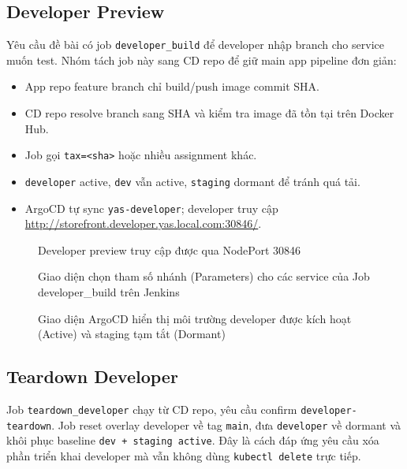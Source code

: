 \subsection{Developer Preview}

Yêu cầu đề bài có job \texttt{developer\_build} để developer nhập branch cho service
muốn test. Nhóm tách job này sang CD repo để giữ main app pipeline đơn giản:

\begin{itemize}
    \item App repo feature branch chỉ build/push image commit SHA.
    \item CD repo  resolve branch sang SHA và kiểm tra image đã tồn tại trên Docker Hub.
    \item Job gọi  \texttt{tax=<sha>} hoặc nhiều assignment khác.
    \item \texttt{developer} active, \texttt{dev} vẫn active, \texttt{staging} dormant để tránh quá tải.
    \item ArgoCD tự sync \texttt{yas-developer}; developer truy cập \url{http://storefront.developer.yas.local.com:30846/}.
\end{itemize}

\begin{figure}[H]
\centering
{}
\caption{Developer preview truy cập được qua NodePort 30846}
\end{figure}

\begin{figure}[H]
\centering
{}
\caption{Giao diện chọn tham số nhánh (Parameters) cho các service của Job developer\_build trên Jenkins}
\end{figure}

\begin{figure}[H]
\centering
{}
\caption{Giao diện ArgoCD hiển thị môi trường developer được kích hoạt (Active) và staging tạm tắt (Dormant)}
\end{figure}

\subsection{Teardown Developer}

Job \texttt{teardown\_developer} chạy từ CD repo, yêu cầu confirm
\texttt{developer-teardown}. Job reset overlay developer về tag \texttt{main},
đưa \texttt{developer} về dormant và khôi phục baseline \texttt{dev + staging active}.
Đây là cách đáp ứng yêu cầu xóa phần triển khai developer mà vẫn không dùng
\texttt{kubectl delete} trực tiếp.


